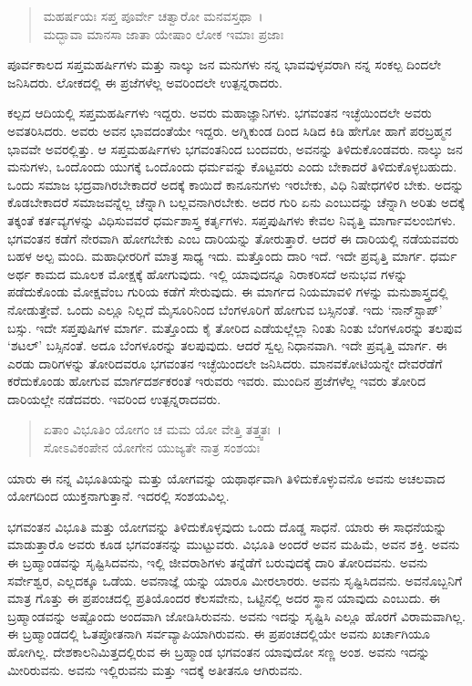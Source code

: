 \begin{verse}
ಮಹರ್ಷಯಃ ಸಪ್ತ ಪೂರ್ವೇ ಚತ್ವಾರೋ ಮನವಸ್ತಥಾ~।\\ಮದ್ಭಾವಾ ಮಾನಸಾ ಜಾತಾ ಯೇಷಾಂ ಲೋಕ ಇಮಾಃ ಪ್ರಜಾಃ 
\end{verse}

{\small ಪೂರ್ವಕಾಲದ ಸಪ್ತಮಹರ್ಷಿಗಳು ಮತ್ತು ನಾಲ್ಕು ಜನ ಮನುಗಳು ನನ್ನ ಭಾವವುಳ್ಳವರಾಗಿ ನನ್ನ ಸಂಕಲ್ಪ ದಿಂದಲೇ ಜನಿಸಿದರು. ಲೋಕದಲ್ಲಿ ಈ ಪ್ರಜೆಗಳೆಲ್ಲ ಅವರಿಂದಲೇ ಉತ್ಪನ್ನರಾದರು.}

ಕಲ್ಪದ ಆದಿಯಲ್ಲಿ ಸಪ್ತಮಹರ್ಷಿಗಳು ಇದ್ದರು. ಅವರು ಮಹಾಜ್ಞಾನಿಗಳು. ಭಗವಂತನ ಇಚ್ಛೆಯಿಂದಲೇ ಅವರು ಅವತರಿಸಿದರು. ಅವರು ಅವನ ಭಾವದಂತೆಯೇ ಇದ್ದರು. ಅಗ್ನಿಕುಂಡ ದಿಂದ ಸಿಡಿದ ಕಿಡಿ ಹೇಗೋ ಹಾಗೆ ಪರಬ್ರಹ್ಮನ ಭಾವವೇ ಅವರಲ್ಲಿತ್ತು. ಆ ಸಪ್ತಮಹರ್ಷಿಗಳು ಭಗವಂತನಿಂದ ಬಂದವರು, ಅವನನ್ನು ತಿಳಿದುಕೊಂಡವರು. ನಾಲ್ಕು ಜನ ಮನುಗಳು, ಒಂದೊಂದು ಯುಗಕ್ಕೆ ಒಂದೊಂದು ಧರ್ಮವನ್ನು ಕೊಟ್ಟವರು ಎಂದು ಬೇಕಾದರೆ ತಿಳಿದುಕೊಳ್ಳಬಹುದು. ಒಂದು ಸಮಾಜ ಭದ್ರವಾಗಿರಬೇಕಾದರೆ ಅದಕ್ಕೆ ಕಾಯಿದೆ ಕಾನೂನುಗಳು ಇರಬೇಕು, ವಿಧಿ ನಿಷೇಧಗಳಿರ ಬೇಕು. ಅದನ್ನು ಕೊಡಬೇಕಾದರೆ ಸಮಾಜವನ್ನೆಲ್ಲ ಚೆನ್ನಾಗಿ ಬಲ್ಲವನಾಗಿರಬೇಕು. ಅದರ ಗುರಿ ಏನು ಎಂಬುದನ್ನು ಚೆನ್ನಾಗಿ ಅರಿತು ಅದಕ್ಕೆ ತಕ್ಕಂತೆ ಕರ್ತವ್ಯಗಳನ್ನು ವಿಧಿಸುವವರೆ ಧರ್ಮಶಾಸ್ತ್ರ ಕರ್ತೃಗಳು. ಸಪ್ತಪುಷಿಗಳು ಕೇವಲ ನಿವೃತ್ತಿ ಮಾರ್ಗಾವಲಂಬಿಗಳು. ಭಗವಂತನ ಕಡೆಗೆ ನೇರವಾಗಿ ಹೋಗಬೇಕು ಎಂಬ ದಾರಿಯನ್ನು ತೋರುತ್ತಾರೆ. ಆದರೆ ಈ ದಾರಿಯಲ್ಲಿ ನಡೆಯವವರು ಬಹಳ ಅಲ್ಪ ಮಂದಿ. ಮಹಾಧೀರರಿಗೆ ಮಾತ್ರ ಸಾಧ್ಯ ಇದು. ಮತ್ತೊಂದು ದಾರಿ ಇದೆ. ಇದೇ ಪ್ರವೃತ್ತಿ ಮಾರ್ಗ. ಧರ್ಮ ಅರ್ಥ ಕಾಮದ ಮೂಲಕ ಮೋಕ್ಷಕ್ಕೆ ಹೋಗುವುದು. ಇಲ್ಲಿ ಯಾವುದನ್ನೂ ನಿರಾಕರಿಸದೆ ಅನುಭವ ಗಳನ್ನು ಪಡೆದುಕೊಂಡು ಮೋಕ್ಷವೆಂಬ ಗುರಿಯ ಕಡೆಗೆ ಸೇರುವುದು. ಈ ಮಾರ್ಗದ ನಿಯಮಾವಳಿ ಗಳನ್ನು ಮನುಶಾಸ್ತ್ರದಲ್ಲಿ ನೋಡುತ್ತೇವೆ. ಒಂದು ಎಲ್ಲೂ ನಿಲ್ಲದೆ ಮೈಸೂರಿನಿಂದ ಬೆಂಗಳೂರಿಗೆ ಹೋಗುವ ಬಸ್ಸಿನಂತೆ. ಇದು ‘ನಾನ್​ಸ್ಟಾಪ್​’ ಬಸ್ಸು. ಇದೇ ಸಪ್ತಪುಷಿಗಳ ಮಾರ್ಗ. ಮತ್ತೊಂದು ಕೈ ತೋರಿದ ಎಡೆಯಲ್ಲೆಲ್ಲಾ ನಿಂತು ನಿಂತು ಬೆಂಗಳೂರನ್ನು ತಲಪುವ ‘ಶಟಲ್​’ ಬಸ್ಸಿನಂತೆ. ಅದೂ ಬೆಂಗಳೂರನ್ನು ತಲಪುವುದು. ಆದರೆ ಸ್ವಲ್ಪ ನಿಧಾನವಾಗಿ. ಇದೇ ಪ್ರವೃತ್ತಿ ಮಾರ್ಗ. ಈ ಎರಡು ದಾರಿಗಳನ್ನು ತೋರಿದವರೂ ಭಗವಂತನ ಇಚ್ಛೆಯಿಂದಲೇ ಜನಿಸಿದರು. ಮಾನವಕೋಟಿಯನ್ನೇ ದೇವರೆಡೆಗೆ ಕರೆದುಕೊಂಡು ಹೋಗುವ ಮಾರ್ಗದರ್ಶಕರಂತೆ ಇರುವರು ಇವರು. ಮುಂದಿನ ಪ್ರಜೆಗಳೆಲ್ಲ ಇವರು ತೋರಿದ ದಾರಿಯಲ್ಲೇ ನಡೆದವರು. ಇವರಿಂದ ಉತ್ಪನ್ನರಾದವರು.

\begin{verse}
ಏತಾಂ ವಿಭೂತಿಂ ಯೋಗಂ ಚ ಮಮ ಯೋ ವೇತ್ತಿ ತತ್ತ್ವತಃ~।\\ಸೋಽವಿಕಂಪೇನ ಯೋಗೇನ ಯುಜ್ಯತೇ ನಾತ್ರ ಸಂಶಯಃ 
\end{verse}

{\small ಯಾರು ಈ ನನ್ನ ವಿಭೂತಿಯನ್ನು ಮತ್ತು ಯೋಗವನ್ನು ಯಥಾರ್ಥವಾಗಿ ತಿಳಿದುಕೊಳ್ಳುವನೊ ಅವನು ಅಚಲವಾದ ಯೋಗದಿಂದ ಯುಕ್ತನಾಗುತ್ತಾನೆ. ಇದರಲ್ಲಿ ಸಂಶಯವಿಲ್ಲ. }

ಭಗವಂತನ ವಿಭೂತಿ ಮತ್ತು ಯೋಗವನ್ನು ತಿಳಿದುಕೊಳ್ಳವುದು ಒಂದು ದೊಡ್ಡ ಸಾಧನೆ. ಯಾರು ಈ ಸಾಧನೆಯನ್ನು ಮಾಡುತ್ತಾರೊ ಅವರು ಕೂಡ ಭಗವಂತನನ್ನು ಮುಟ್ಟುವರು. ವಿಭೂತಿ ಅಂದರೆ ಅವನ ಮಹಿಮೆ, ಅವನ ಶಕ್ತಿ. ಅವನು ಈ ಬ್ರಹ್ಮಾಂಡವನ್ನು ಸೃಷ್ಟಿಸಿದವನು, ಇಲ್ಲಿ ಜೀವರಾಶಿಗಳು ತನ್ನೆಡೆಗೆ ಬರುವುದಕ್ಕೆ ದಾರಿ ತೋರಿದವನು. ಅವನು ಸರ್ವೇಶ್ವರ, ಎಲ್ಲದಕ್ಕೂ ಒಡೆಯ. ಅವನಾಜ್ಞೆ ಯನ್ನು ಯಾರೂ ಮೀರಲಾರರು. ಅವನು ಸೃಷ್ಟಿಸಿದವನು. ಅವನೊಬ್ಬನಿಗೆ ಮಾತ್ರ ಗೊತ್ತು ಈ ಪ್ರಪಂಚದಲ್ಲಿ ಪ್ರತಿಯೊಂದರ ಕೆಲಸವೇನು, ಒಟ್ಟಿನಲ್ಲಿ ಅದರ ಸ್ಥಾನ ಯಾವುದು ಎಂಬುದು. ಈ ಬ್ರಹ್ಮಾಂಡವನ್ನು ಅಷ್ಟೊಂದು ಅಂದವಾಗಿ ಜೋಡಿಸಿರುವನು. ಅವನು ಇದನ್ನು ಸೃಷ್ಟಿಸಿ ಎಲ್ಲೂ ಹೊರಗೆ ವಿರಾಮವಾಗಿಲ್ಲ. ಈ ಬ್ರಹ್ಮಾಂಡದಲ್ಲಿ ಓತಪ್ರೋತನಾಗಿ ಸರ್ವವ್ಯಾಪಿಯಾಗಿರುವನು. ಈ ಪ್ರಪಂಚದಲ್ಲಿಯೇ ಅವನು ಖರ್ಚಾಗಿಯೂ ಹೋಗಿಲ್ಲ. ದೇಶಕಾಲನಿಮಿತ್ತದಲ್ಲಿರುವ ಈ ಬ್ರಹ್ಮಾಂಡ ಭಗವಂತನ ಯಾವುದೋ ಸಣ್ಣ ಅಂಶ. ಅವನು ಇದನ್ನು ಮೀರಿರುವನು. ಅವನು ಇಲ್ಲಿರುವನು ಮತ್ತು ಇದಕ್ಕೆ ಅತೀತನೂ ಆಗಿರುವನು.

